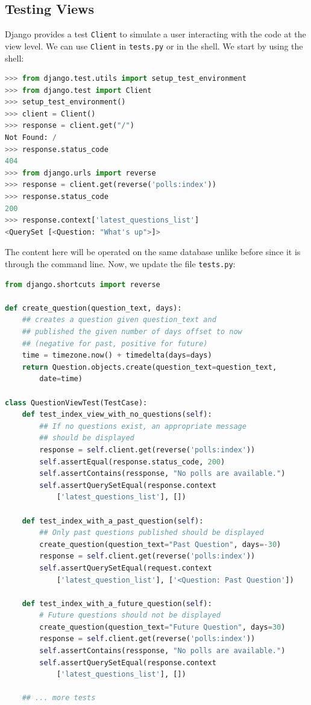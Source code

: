 \documentclass[a4paper, openany]{memoir}
\begin{document}
    \subsection{Testing Views}
    Django provides a test \texttt{Client} to simulate a user interacting with the code at the view level. We can use \texttt{Client} in \texttt{tests.py} or in the shell. We start by using the shell:
\begin{lstlisting}[language=python]
>>> from django.test.utils import setup_test_environment
>>> from django.test import Client
>>> setup_test_environment()
>>> client = Client()
>>> response = client.get("/")
Not Found: /
>>> response.status_code
404
>>> from django.urls import reverse
>>> response = client.get(reverse('polls:index'))
>>> response.status_code
200
>>> response.context['latest_questions_list']
<QuerySet [<Question: "What's up">]>
\end{lstlisting}
    The content here will be operated on the same database unlike before since it is through the command line. Now, we update the file \texttt{tests.py}:
\begin{lstlisting}[language=python]
from django.shortcuts import reverse

def create_question(question_text, days):
    ## creates a question given question_text and 
    ## published the given number of days offset to now
    ## (negative for past, positive for future)
    time = timezone.now() + timedelta(days=days)
    return Question.objects.create(question_text=question_text, 
        date=time)

class QuestionViewTest(TestCase):
    def test_index_view_with_no_questions(self):
        ## If no questions exist, an appropriate message
        ## should be displayed
        response = self.client.get(reverse('polls:index'))
        self.assertEqual(response.status_code, 200)
        self.assertContains(ressponse, "No polls are available.")
        self.assertQuerySetEqual(response.context
            ['latest_questions_list'], [])
    
    def test_index_with_a_past_question(self):
        ## Only past questions published should be displayed
        create_question(question_text="Past Question", days=-30)
        response = self.client.get(reverse('polls:index'))
        self.assertQuerySetEqual(request.context
            ['latest_question_list'], ['<Question: Past Question'])
    
    def test_index_with_a_future_question(self):
        # Future questions should not be displayed
        create_question(question_text="Future Question", days=30)
        response = self.client.get(reverse('polls:index'))
        self.assertContains(ressponse, "No polls are available.")
        self.assertQuerySetEqual(response.context
            ['latest_questions_list'], [])
    
    ## ... more tests
\end{lstlisting}
\end{document}
